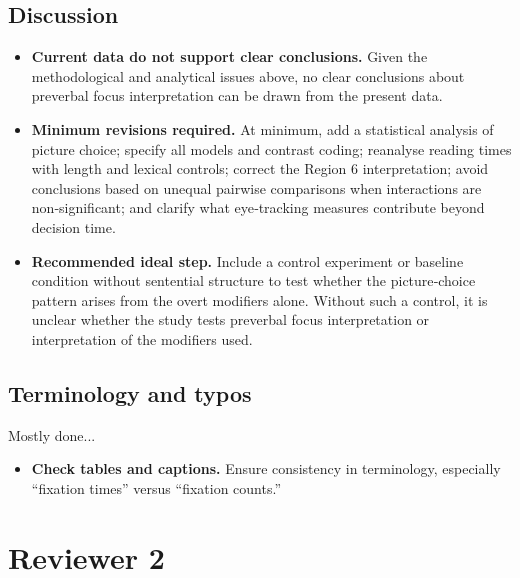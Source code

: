 \documentclass[a4paper, ruler]{CUP-JNL-LIN}%
\begin{document}
\subsection{Discussion}

\begin{itemize}
  \item \textbf{Current data do not support clear conclusions.} Given the methodological and analytical issues above, no clear conclusions about preverbal focus interpretation can be drawn from the present data.
  \item \textbf{Minimum revisions required.} At minimum, add a statistical analysis of picture choice; specify all models and contrast coding; reanalyse reading times with length and lexical controls; correct the Region 6 interpretation; avoid conclusions based on unequal pairwise comparisons when interactions are non‑significant; and clarify what eye‑tracking measures contribute beyond decision time.
  \item \textbf{Recommended ideal step.} Include a control experiment or baseline condition without sentential structure to test whether the picture‑choice pattern arises from the overt modifiers alone. Without such a control, it is unclear whether the study tests preverbal focus interpretation or interpretation of the modifiers used.
\end{itemize}

\subsection{Terminology and typos}

Mostly done... \bigstar

\begin{itemize}
  \item \textbf{Check tables and captions.} Ensure consistency in terminology, especially ``fixation times'' versus ``fixation counts.''
\end{itemize}

\section{Reviewer 2}
\end{document}
